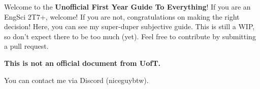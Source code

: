 Welcome to the \textbf{Unofficial First Year Guide To Everything}! If you are an EngSci 2T7+, welcome! If you are not, congratulations on making the right decision! Here, you can see my super-duper subjective guide. This is still a WIP, so don't expect there to be too much (yet). Feel free to contribute by submitting a pull request.

\bigskip
\centerline{\textbf{This is not an official document from UofT.}}
\bigskip

You can contact me via Discord (niceguybtw).
